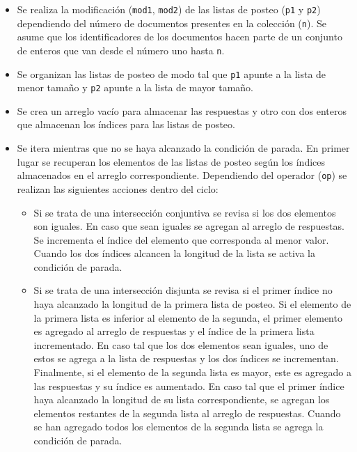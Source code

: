 \begin{itemize}
    \item Se realiza la modificación (\texttt{mod1}, \texttt{mod2}) de las listas de posteo (\texttt{p1} y \texttt{p2}) dependiendo del número de documentos presentes en la colección (\texttt{n}). Se asume que los identificadores de los documentos hacen parte de un conjunto de enteros que van desde el número uno hasta \texttt{n}.
    \item Se organizan las listas de posteo de modo tal que \texttt{p1} apunte a la lista de menor tamaño y \texttt{p2} apunte a la lista de mayor tamaño.
    \item Se crea un arreglo vacío para almacenar las respuestas y otro con dos enteros que almacenan los índices para las listas de posteo.
    \item Se itera mientras que no se haya alcanzado la condición de parada. En primer lugar se recuperan los elementos de las listas de posteo según los índices almacenados en el arreglo correspondiente. Dependiendo del operador (\texttt{op}) se realizan las siguientes acciones dentro del ciclo:
    
    \begin{itemize}
        \item Si se trata de una intersección conjuntiva se revisa si los dos elementos son iguales. En caso que sean iguales se agregan al arreglo de respuestas. Se incrementa el índice del elemento que corresponda al menor valor. Cuando los dos índices alcancen la longitud de la lista se activa la condición de parada.
        \item Si se trata de una intersección disjunta se revisa si el primer índice no haya alcanzado la longitud de la primera lista de posteo. Si el elemento de la primera lista es inferior al elemento de la segunda, el primer elemento es agregado al arreglo de respuestas y el índice de la primera lista incrementado. En caso tal que los dos elementos sean iguales, uno de estos se agrega a la lista de respuestas y los dos índices se incrementan. Finalmente, si el elemento de la segunda lista es mayor, este es agregado a las respuestas y su índice es aumentado. En caso tal que el primer índice haya alcanzado la longitud de su lista correspondiente, se agregan los elementos restantes de la segunda lista al arreglo de respuestas. Cuando se han agregado todos los elementos de la segunda lista se agrega la condición de parada.
    \end{itemize}
\end{itemize}

